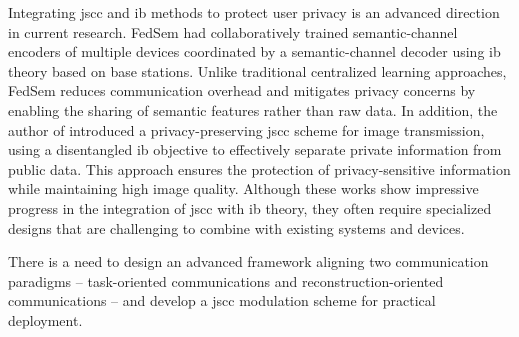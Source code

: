 Integrating \gls{jscc} and \gls{ib} methods to protect user privacy is an advanced direction in current research. FedSem \cite{Wei_2023_FSL} had collaboratively trained semantic-channel encoders of multiple devices coordinated by a semantic-channel decoder using \gls{ib} theory based on base stations. Unlike traditional centralized learning approaches, FedSem reduces communication overhead and mitigates privacy concerns by enabling the sharing of semantic features rather than raw data. In addition, the author of \cite{Sun_2024_DIB} introduced a privacy-preserving \gls{jscc} scheme for image transmission, using a disentangled \gls{ib} objective to effectively separate private information from public data. This approach ensures the protection of privacy-sensitive information while maintaining high image quality. Although these works show impressive progress in the integration of \gls{jscc} with \gls{ib} theory, they often require specialized designs that are challenging to combine with existing systems and devices.

There is a need to design an advanced framework aligning two communication paradigms -- task-oriented communications and reconstruction-oriented communications -- and develop a \gls{jscc} modulation scheme for practical deployment.